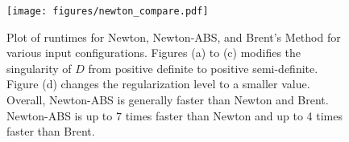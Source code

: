 \begin{figure}[t]
    \centering 
    \texttt{[image: figures/newton\_compare.pdf]}
    \caption{Plot of runtimes for Newton, Newton-ABS, and Brent's Method
    for various input configurations.
    Figures (a) to (c) modifies the singularity of $D$ from positive definite to positive semi-definite.
    Figure (d) changes the regularization level to a smaller value.
    Overall, Newton-ABS is generally faster than Newton and Brent.
    Newton-ABS is up to 7 times faster than Newton and up to 4 times faster than Brent.
    }
    \label{fig:bench:newton-compare}
\end{figure}

